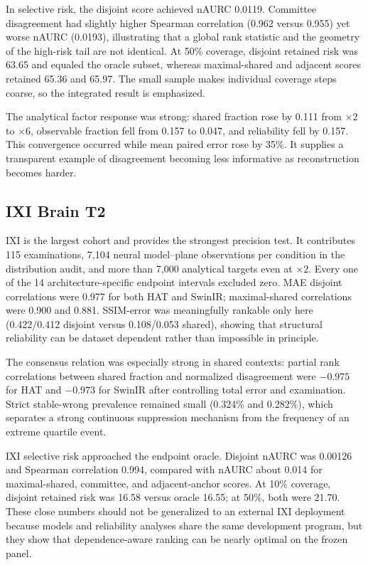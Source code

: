 \documentclass[journal,10pt]{IEEEtran}
\begin{document}
In selective risk, the disjoint score achieved nAURC 0.0119. Committee disagreement had slightly higher Spearman correlation (0.962 versus 0.955) yet worse nAURC (0.0193), illustrating that a global rank statistic and the geometry of the high-risk tail are not identical. At 50\% coverage, disjoint retained risk was 63.65 and equaled the oracle subset, whereas maximal-shared and adjacent scores retained 65.36 and 65.97. The small sample makes individual coverage steps coarse, so the integrated result is emphasized.

The analytical factor response was strong: shared fraction rose by 0.111 from $\times2$ to $\times6$, observable fraction fell from 0.157 to 0.047, and reliability fell by 0.157. This convergence occurred while mean paired error rose by 35\%. It supplies a transparent example of disagreement becoming less informative as reconstruction becomes harder.

\subsection{IXI Brain T2}
IXI is the largest cohort and provides the strongest precision test. It contributes 115 examinations, 7,104 neural model--plane observations per condition in the distribution audit, and more than 7,000 analytical targets even at $\times2$. Every one of the 14 architecture-specific endpoint intervals excluded zero. MAE disjoint correlations were 0.977 for both HAT and SwinIR; maximal-shared correlations were 0.900 and 0.881. SSIM-error was meaningfully rankable only here (0.422/0.412 disjoint versus 0.108/0.053 shared), showing that structural reliability can be dataset dependent rather than impossible in principle.

The consensus relation was especially strong in shared contexts: partial rank correlations between shared fraction and normalized disagreement were $-0.975$ for HAT and $-0.973$ for SwinIR after controlling total error and examination. Strict stable-wrong prevalence remained small (0.324\% and 0.282\%), which separates a strong continuous suppression mechanism from the frequency of an extreme quartile event.

IXI selective risk approached the endpoint oracle. Disjoint nAURC was 0.00126 and Spearman correlation 0.994, compared with nAURC about 0.014 for maximal-shared, committee, and adjacent-anchor scores. At 10\% coverage, disjoint retained risk was 16.58 versus oracle 16.55; at 50\%, both were 21.70. These close numbers should not be generalized to an external IXI deployment because models and reliability analyses share the same development program, but they show that dependence-aware ranking can be nearly optimal on the frozen panel.
\end{document}
